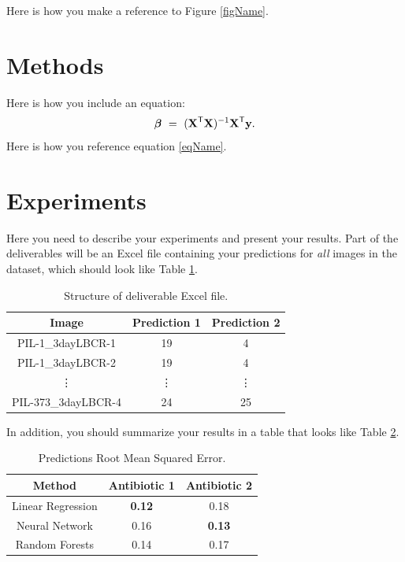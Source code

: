 \documentclass[conference]{IEEEtran}
\def \X{\boldsymbol{\rm X}}
\def \y{\boldsymbol{\rm y}}
\def \bbeta{\boldsymbol{\beta}}
\def \T{\mathsf{T}}
\begin{document}
Here is how you make a reference to Figure \ref{figName}.

\section{Methods}
Here is how you include an equation:
\begin{align}
\label{eqName}
\bbeta \ = \ (\X^\T\X)^{-1}\X^\T\y.
\end{align}
Here is how you reference equation \eqref{eqName}.



\section{Experiments}
Here you need to describe your experiments and present your results. Part of the deliverables will be an Excel file containing your predictions for {\em all} images in the dataset, which should look like Table \ref{tabDeliverable}.
\begin{table}[h]
\begin{center}
\begin{tabular}{| c || c | c |}
\hline
Image & Prediction 1 & Prediction 2 \\ \hline \hline
PIL-1\_3dayLBCR-1 & 19 & 4 \\ \hline
PIL-1\_3dayLBCR-2 & 19 & 4 \\ \hline
\vdots & \vdots & \vdots \\ \hline
PIL-373\_3dayLBCR-4 & 24 & 25 \\ \hline
\end{tabular}
\caption{Structure of deliverable Excel file.}
\label{tabDeliverable}
\end{center}
\end{table}

In addition, you should summarize your results in a table that looks like Table \ref{tabSummary}.
\begin{table}[h]
\begin{center}
\begin{tabular}{| c || c | c |}
\hline
Method & Antibiotic 1 & Antibiotic 2 \\ \hline \hline
Linear Regression & \textbf{0.12} & 0.18 \\ \hline
Neural Network & 0.16 & \textbf{0.13} \\ \hline
Random Forests & 0.14 & 0.17 \\ \hline
\end{tabular}
\caption{Predictions Root Mean Squared Error.}
\label{tabSummary}
\end{center}
\end{table}
\end{document}
